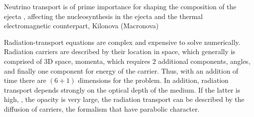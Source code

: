 Neutrino transport is of prime importance for shaping the composition of the ejecta
\citep{Wanajo:2014wha,Sekiguchi:2015dma,Foucart:2015vpa,Foucart:2015gaa},
affecting the nucleosynthesis in the ejecta \citep{pWanajo:2014wha,Goriely:2015fqa} 
and the thermal electromagnetic counterpart, Kilonova (Macronova) \citep{Metzger:2014ila,Lippuner:2015gwa}

%
Radiation-transport equations are complex and expensive to solve numerically. 
Radiation carriers are described by their location in space, which generally is comprised of $3$D space, momenta, 
which requires $2$ additional components, angles, and finally one component for energy of the carrier. 
Thus, with an addition of time there are $(6+1)$ dimensions for the problem. 
In addition, radiation transport depends strongly on the optical depth of the medium. 
If the latter is high, \ie, the opacity is very large, the radiation transport 
can be described by the diffusion of carriers, the formalism that have parabolic character. 
